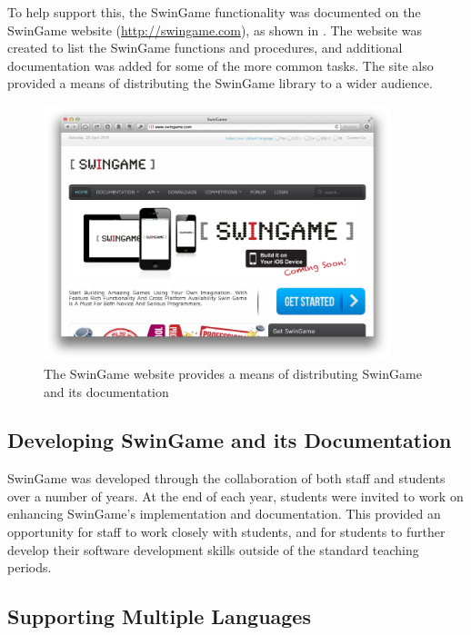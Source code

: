 To help support this, the SwinGame functionality was documented on the SwinGame website (\url{http://swingame.com}), as shown in . The website was created to list the SwinGame functions and procedures, and additional documentation was added for some of the more common tasks. The site also provided a means of distributing the SwinGame library to a wider audience.

\begin{figure}[thbp]
  \centering
  \includegraphics[width=0.9\textwidth]{SwinGame}
  \caption{The SwinGame website provides a means of distributing SwinGame and its documentation}
  \label{fig:website}
\end{figure}


\subsection{Developing SwinGame and its Documentation} %
\label{sub:developing_swingame_and_its_documentation}

SwinGame was developed through the collaboration of both staff and students over a number of years. At the end of each year, students were invited to work on enhancing SwinGame's implementation and documentation. This provided an opportunity for staff to work closely with students, and for students to further develop their software development skills outside of the standard teaching periods.


\subsection{Supporting Multiple Languages} %
\label{sub:supporting_multiple_languages}

